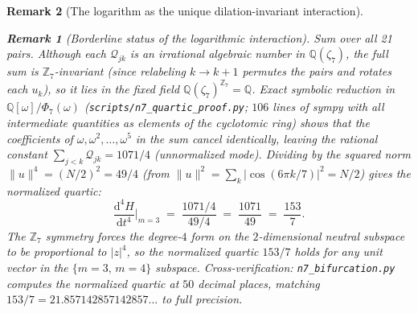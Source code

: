 \documentclass[12pt, a4paper]{article}
\newtheorem{remark}{Remark}[section]
\numberwithin{equation}{section}
\newcommand{\dd}{\mathrm{d}}
\begin{document}
\begin{remark}[The logarithm as the unique dilation-invariant interaction]
\begin{remark}[Borderline status of the logarithmic interaction]
\emph{Sum over all 21 pairs.}  Although each $\mathcal{Q}_{jk}$ is
an irrational algebraic number in $\mathbb{Q}(\zeta_7)$, the full
sum is $\mathbb{Z}_7$-invariant (since relabeling $k \to k+1$
permutes the pairs and rotates each $u_k$), so it lies in the
fixed field $\mathbb{Q}(\zeta_7)^{\mathbb{Z}_7} = \mathbb{Q}$.
Exact symbolic reduction in $\mathbb{Q}[\omega]/\Phi_7(\omega)$
(\texttt{scripts/n7\_quartic\_proof.py}; $106$ lines of sympy
with all intermediate quantities as elements of the cyclotomic
ring) shows that the coefficients of $\omega, \omega^2, \ldots, \omega^5$
in the sum cancel identically, leaving the rational constant
$\sum_{j<k}\mathcal{Q}_{jk} = 1071/4$ (unnormalized mode).
Dividing by the squared norm $\|u\|^4 = (N/2)^2 = 49/4$ (from
$\|u\|^2 = \sum_k |\cos(6\pi k/7)|^2 = N/2$) gives the normalized
quartic:
\begin{equation}\label{eq:quartic-153}
  \frac{\dd^4 H}{\dd t^4}\bigg|_{m=3}
  \;=\; \frac{1071/4}{49/4} \;=\; \frac{1071}{49}
  \;=\; \frac{153}{7}.
\end{equation}
The $\mathbb{Z}_7$ symmetry forces the degree-$4$ form on the
$2$-dimensional neutral subspace to be proportional to $|z|^4$,
so the normalized quartic $153/7$ holds for any unit vector in
the $\{m{=}3,\,m{=}4\}$ subspace.
Cross-verification: \texttt{n7\_bifurcation.py} computes the
normalized quartic at $50$ decimal places, matching
$153/7 = 21.857142857142857\ldots$ to full precision.


\end{remark}
\end{remark}
\end{document}
